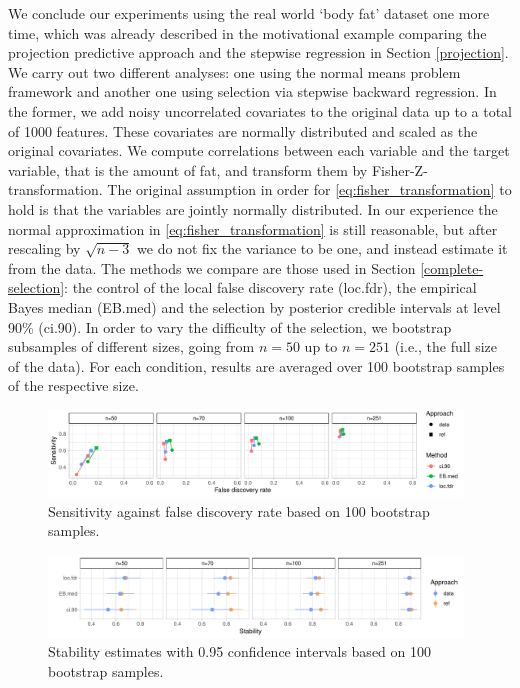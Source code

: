 \documentclass[american,]{article}
\theoremstyle{definition}
\begin{document}
We conclude our  experiments using the real world `body fat' dataset
one more time, which was already described in the motivational example
comparing the projection predictive approach and the stepwise
regression in Section \ref{projection}. We carry out two different
analyses: one using the normal means problem framework and another one
using selection via stepwise backward regression. In the former, we
add noisy uncorrelated covariates to the original data up to a total
of 1000 features. These covariates are normally distributed and scaled
as the original covariates. We compute correlations between each
variable and the target variable, that is the amount of fat, and
transform them by Fisher-Z-transformation. The original assumption in
order for \eqref{eq:fisher_transformation} to hold is that the
variables are jointly normally distributed. In our experience the
normal approximation in \eqref{eq:fisher_transformation} is still
reasonable, but after rescaling by $\sqrt{n-3}$ we do not fix the
variance to be one, and instead estimate it from the data. The methods
we compare are those used in Section \ref{complete-selection}: the
control of the local false discovery rate (loc.fdr), the empirical
Bayes median (EB.med) and the selection by posterior credible
intervals at level 90\% (ci.90).  In order to vary the difficulty of
the selection, we bootstrap subsamples of different sizes, going from
$n=50$ up to $n=251$ (i.e., the full size of the data). For each
condition, results are averaged over 100 bootstrap samples of the
respective size.

\begin{figure}[tp]
  \centering
  \includegraphics[width=0.98\textwidth]{graphics/bodyfat_sensitivity_vs_fdr.pdf}
  \caption{Sensitivity against false discovery rate based on 100 bootstrap samples.\\}
  \label{fig:bodyfat_sensitivity_vs_fdr}
\end{figure}

\begin{figure}[tp]
  \centering
  \includegraphics[width=0.98\textwidth]{graphics/bodyfat_stability.pdf}
  \caption{Stability estimates with 0.95 confidence intervals based on 100 bootstrap samples.\\}
  \label{fig:bodyfat_stability}
\end{figure}
\end{document}
